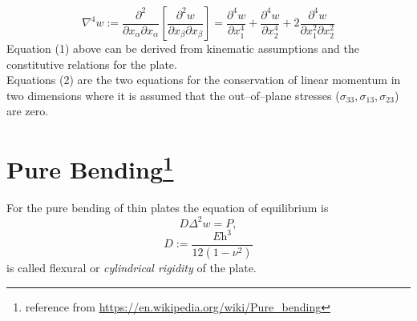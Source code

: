 $$\nabla^4 \textit{w} := \frac{\partial^2}{\partial x_\alpha \partial x_\alpha}\left[\frac{\partial^2 \textit{w}} {\partial x_\beta \partial x_\beta }\right] = \frac{\partial^4 \textit{w}}{\partial x_1^4} + \frac{\partial^4 \textit{w}}{\partial x_2^4} + 2\frac{\partial^4 \textit{w}}{\partial x_1^2 \partial x_2^2}$$
Equation (1) above can be derived from kinematic assumptions and the constitutive relations for the plate.\\
Equations (2) are the two equations for the conservation of linear momentum in two dimensions where it is assumed that the out–of–plane stresses ($\sigma_{33},\sigma_{13},\sigma_{23}$) are zero.
\section*{Pure Bending\footnote{reference from \url{https://en.wikipedia.org/wiki/Pure_bending}}}
For the pure bending of thin plates the equation of equilibrium is
\begin{equation}
    \textit{D}\Delta^2 \textit{w} = \textit{P} ,\tag*{where}
\end{equation}
$$\textit{D}:=  \frac{\textit{E}\textit{h}^3}{12(1-\nu^2)}$$
is called flexural or \textit{cylindrical rigidity} of the plate.
